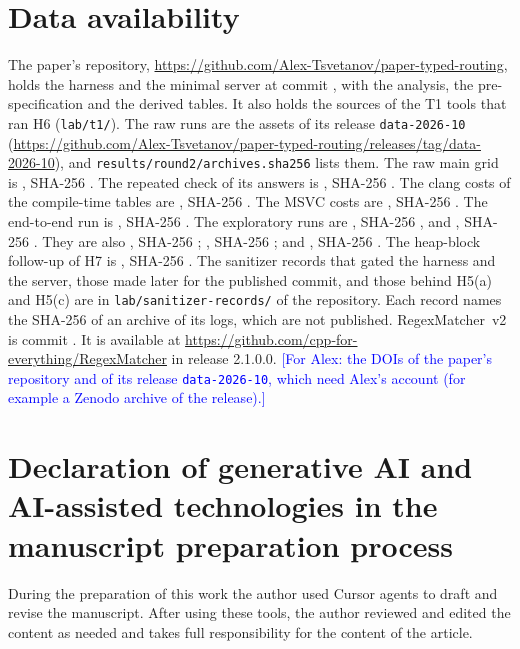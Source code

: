 \documentclass[preprint,12pt,authoryear]{elsarticle}
\newif\ifsubmission
\newcommand{\ForAlex}[1]{\ifsubmission\PackageWarning{main}{a ForAlex note is left in the text}\else
  \textcolor{blue}{[For Alex: #1]}\fi}
\newcommand{\RegexMatcherURL}{\url{https://github.com/cpp-for-everything/RegexMatcher}}
\newcommand{\RegexMatcherRelease}{2.1.0.0}
\newcommand{\PaperRepoURL}{\url{https://github.com/Alex-Tsvetanov/paper-typed-routing}}
\newcommand{\DataRelease}{\texttt{data-2026-10}}
\newcommand{\DataReleaseURL}{\url{https://github.com/Alex-Tsvetanov/paper-typed-routing/releases/tag/data-2026-10}}
\newcommand{\RecordsDir}{\texttt{lab/sanitizer-records/}}
\newcommand{\hex}[1]{\texttt{\expandafter\seqsplit\expandafter{#1}}}
\begin{document}
\section*{Data availability}

The paper's repository, \PaperRepoURL, holds the harness and the minimal server at
commit \hex{\RbenchPublicCommitFull}, with the analysis, the pre-specification and the derived
tables. It also holds the sources of the T1 tools that ran H6 (\texttt{lab/t1/}). The raw runs are
the assets of its release \DataRelease{} (\DataReleaseURL), and \texttt{results/round2/archives.sha256}
lists them. The raw main grid is \hex{\ArchiveMain}, SHA-256 \hex{\ArchiveMainSha}. The repeated
check of its answers is \hex{\ArchiveVerify}, SHA-256 \hex{\ArchiveVerifySha}. The clang costs of
the compile-time tables are \hex{\ArchiveCt}, SHA-256 \hex{\ArchiveCtSha}. The MSVC costs are
\hex{\ArchiveMsvc}, SHA-256 \hex{\ArchiveMsvcSha}. The end-to-end run is \hex{\ArchiveHSix}, SHA-256
\hex{\ArchiveHSixSha}. The exploratory runs are \hex{\ArchiveExGithub}, SHA-256
\hex{\ArchiveExGithubSha}, and \hex{\ArchiveExMiss}, SHA-256 \hex{\ArchiveExMissSha}. They are also
\hex{\ArchiveExVocab}, SHA-256 \hex{\ArchiveExVocabSha}; \hex{\ArchiveExZipf}, SHA-256
\hex{\ArchiveExZipfSha}; and \hex{\ArchiveExNoDecoy}, SHA-256 \hex{\ArchiveExNoDecoySha}. The
heap-block follow-up of H7 is \hex{\ArchiveCtHeap}, SHA-256 \hex{\ArchiveCtHeapSha}. The sanitizer
records that gated the harness and the server, those made later for the published commit, and those
behind H5(a) and H5(c) are in \RecordsDir{} of the repository. Each record names the SHA-256 of an archive of its logs, which are not published.
RegexMatcher~v2 is commit \hex{\RegexMatcherCommitFull}. It is available at \RegexMatcherURL{} in
release \RegexMatcherRelease. \ForAlex{the DOIs of the paper's repository and of its release
\DataRelease, which need Alex's account (for example a Zenodo archive of the release).}

\section*{Declaration of generative AI and AI-assisted technologies in the manuscript preparation process}

During the preparation of this work the author used Cursor agents to draft and revise the manuscript.
After using these tools, the author reviewed and edited the content as needed and takes full responsibility for the content of the article.
\end{document}
